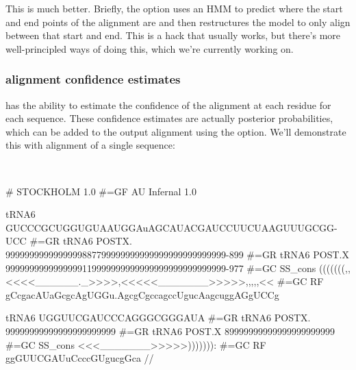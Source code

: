 This is much better. Briefly, the  option uses an HMM to
predict where the start and end points of the alignment are and then
restructures the model to only align between that start and end. This
is a hack that usually works, but there's more well-principled ways of
doing this, which we're currently working on.

\subsubsection{alignment confidence estimates}
 has the ability to estimate the confidence of the
alignment at each residue for each sequence. These confidence estimates
are actually posterior probabilities, which can be added to
the output alignment using the  option. We'll demonstrate
this with alignment of a single sequence:

\\

{\samepage
\begin{sreoutput}
# STOCKHOLM 1.0
#=GF AU Infernal 1.0

tRNA6             GUCCCGCUGGUGUAAUGGAuAGCAUACGAUCCUUCUAAGUUUGCGG-UCC
#=GR tRNA6 POSTX. 9999999999999999887799999999999999999999999999-899
#=GR tRNA6 POST.X 9999999999999999119999999999999999999999999999-977
#=GC SS_cons      (((((((,,<<<<______._>>>>,<<<<<_______>>>>>,,,,,<<
#=GC RF           gCcgacAUaGcgcAgUGGu.AgcgCgccagccUgucAagcuggAGgUCCg

tRNA6             UGGUUCGAUCCCAGGGCGGGAUA
#=GR tRNA6 POSTX. 99999999999999999999999
#=GR tRNA6 POST.X 89999999999999999999999
#=GC SS_cons      <<<_______>>>>>))))))):
#=GC RF           ggGUUCGAUuCcccGUgucgGca
//
\end{sreoutput}
}

